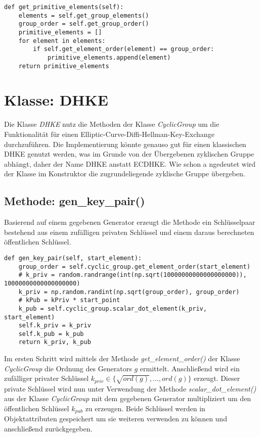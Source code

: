 \vspace{\baselineskip}
\begin{lstlisting}[caption={Methode: get\_primitive\_elements()}, captionpos=b]
def get_primitive_elements(self):
    elements = self.get_group_elements()
    group_order = self.get_group_order()
    primitive_elements = []
    for element in elements:
        if self.get_element_order(element) == group_order:
            primitive_elements.append(element)
    return primitive_elements
\end{lstlisting}
\vspace{\baselineskip}

\section{Klasse: DHKE}
Die Klasse \textit{DHKE} nutz die Methoden der Klasse \textit{CyclicGroup} um die Funktionalität für einen Elliptic-Curve-Diffi-Hellman-Key-Exchange durchzuführen. Die Implementierung könnte genauso gut für einen klassischen DHKE genutzt werden, was im Grunde von der Übergebenen zyklischen Gruppe abhängt, daher der Name DHKE anstatt ECDHKE. Wie schon a ngedeutet wird der Klasse im Konstruktor die zugrundeliegende zyklische Gruppe übergeben.
\subsection{Methode: gen\_key\_pair()}
Basierend auf einem gegebenen Generator erzeugt die Methode ein Schlüsselpaar bestehend aus einem zufälligen privaten Schlüssel und einem daraus berechneten öffentlichen Schlüssel.
\vspace{\baselineskip}
\begin{lstlisting}[caption={Methode: get\_primitive\_elements()}, captionpos=b]
def gen_key_pair(self, start_element):
    group_order = self.cyclic_group.get_element_order(start_element)
    # k_priv = random.randrange(int(np.sqrt(10000000000000000000)), 10000000000000000000)
    k_priv = np.random.randint(np.sqrt(group_order), group_order)
    # kPub = kPriv * start_point
    k_pub = self.cyclic_group.scalar_dot_element(k_priv, start_element)
    self.k_priv = k_priv
    self.k_pub = k_pub
    return k_priv, k_pub
\end{lstlisting}
\vspace{\baselineskip}

Im ersten Schritt wird mittels der Methode \textit{get\_element\_order()} der Klasse \textit{CyclicGroup} die Ordnung des Generators $g$ ermittelt. Anschließend wird ein zufälliger privater Schlüssel $k_{priv} \in \{\sqrt{ord(g)},..., ord(g)\}$ erzeugt. Dieser private Schlüssel wird nun unter Verwendung der Methode \textit{scalar\_dot\_element()} aus der Klasse \textit{CyclicGroup} mit dem gegebenen Generator multipliziert um den öffentlichen Schlüssel $k_{pub}$ zu erzeugen. Beide Schlüssel werden in Objektattributen gespeichert um sie weiteren verwenden zu können und anschließend zurückgegeben.

